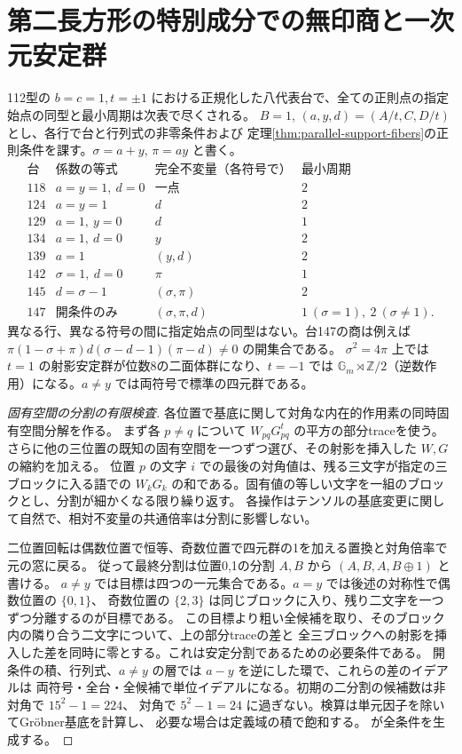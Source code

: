 \section{第二長方形の特別成分での無印商と一次元安定群}
\label{sec:parallel-vertical-orbits}
\begin{theorem}\label{thm:parallel-vertical-orbits}
112型の $b=c=1,t=\pm1$ における正規化した八代表台で、全ての正則点の指定始点の同型と最小周期は次表で尽くされる。
$B=1$, $(a,y,d)=(A/t,C,D/t)$ とし、各行で台と行列式の非零条件および
定理\ref{thm:parallel-support-fibers}の正則条件を課す。$\sigma=a+y$, $\pi=ay$ と書く。
\[
\begin{array}{c|c|c|c}
 台&\text{係数の等式}&\text{完全不変量（各符号で）}&\text{最小周期}\\\hline
118&a=y=1,\ d=0&\text{一点}&2\\
124&a=y=1&d&2\\
129&a=1,\ y=0&d&1\\
134&a=1,\ d=0&y&2\\
139&a=1&(y,d)&2\\
142&\sigma=1,\ d=0&\pi&1\\
145&d=\sigma-1&(\sigma,\pi)&2\\
147&\text{開条件のみ}&(\sigma,\pi,d)&1\ (\sigma=1),\ 2\ (\sigma\ne1).
\end{array}
\]
異なる行、異なる符号の間に指定始点の同型はない。台147の商は例えば
$\pi(1-\sigma+\pi)d(\sigma-d-1)(\pi-d)\ne0$ の開集合である。
$\sigma^2=4\pi$ 上では $t=1$ の射影安定群が位数8の二面体群になり、$t=-1$ では
$\mathbb G_m\rtimes\mathbb Z/2$（逆数作用）になる。$a\ne y$ では両符号で標準の四元群である。
\end{theorem}

\begin{proof}[固有空間の分割の有限検査]
各位置で基底に関して対角な内在的作用素の同時固有空間分解を作る。
まず各 $p\ne q$ について $W_{pq}G_{pq}^t$ の平方の部分traceを使う。
さらに他の三位置の既知の固有空間を一つずつ選び、その射影を挿入した $W,G$ の縮約を加える。
位置 $p$ の文字 $i$ での最後の対角値は、残る三文字が指定の三ブロックに入る語での
$W_kG_k$ の和である。固有値の等しい文字を一組のブロックとし、分割が細かくなる限り繰り返す。
各操作はテンソルの基底変更に関して自然で、相対不変量の共通倍率は分割に影響しない。

二位置回転は偶数位置で恒等、奇数位置で四元群の1を加える置換と対角倍率で元の窓に戻る。
従って最終分割は位置0,1の分割 $A,B$ から $(A,B,A,B\oplus1)$ と書ける。
$a\ne y$ では目標は四つの一元集合である。$a=y$ では後述の対称性で偶数位置の $\{0,1\}$、
奇数位置の $\{2,3\}$ は同じブロックに入り、残り二文字を一つずつ分離するのが目標である。
この目標より粗い全候補を取り、そのブロック内の隣り合う二文字について、上の部分traceの差と
全三ブロックへの射影を挿入した差を同時に零とする。これは安定分割であるための必要条件である。
開条件の積、行列式、$a\ne y$ の層では $a-y$ を逆にした環で、これらの差のイデアルは
両符号・全台・全候補で単位イデアルになる。初期の二分割の候補数は非対角で $15^2-1=224$、
対角で $5^2-1=24$ に過ぎない。検算は単元因子を除いてGröbner基底を計算し、
必要な場合は定義域の積で飽和する。 が全条件を生成する。
\end{proof}

